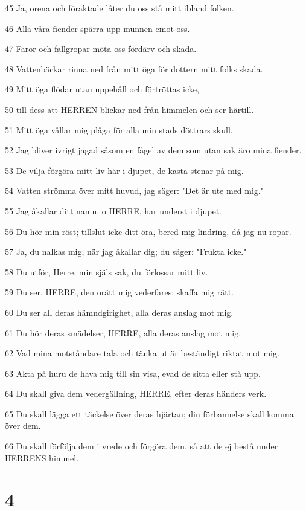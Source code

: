 \par 45 Ja, orena och föraktade låter du oss stå mitt ibland folken.
\par 46 Alla våra fiender spärra upp munnen emot oss.
\par 47 Faror och fallgropar möta oss fördärv och skada.
\par 48 Vattenbäckar rinna ned från mitt öga för dottern mitt folks skada.
\par 49 Mitt öga flödar utan uppehåll och förtröttas icke,
\par 50 till dess att HERREN blickar ned från himmelen och ser härtill.
\par 51 Mitt öga vållar mig plåga för alla min stads döttrars skull.
\par 52 Jag bliver ivrigt jagad såsom en fågel av dem som utan sak äro mina fiender.
\par 53 De vilja förgöra mitt liv här i djupet, de kasta stenar på mig.
\par 54 Vatten strömma över mitt huvud, jag säger: "Det är ute med mig."
\par 55 Jag åkallar ditt namn, o HERRE, har underst i djupet.
\par 56 Du hör min röst; tillslut icke ditt öra, bered mig lindring, då jag nu ropar.
\par 57 Ja, du nalkas mig, när jag åkallar dig; du säger: "Frukta icke."
\par 58 Du utför, Herre, min själs sak, du förlossar mitt liv.
\par 59 Du ser, HERRE, den orätt mig vederfares; skaffa mig rätt.
\par 60 Du ser all deras hämndgirighet, alla deras anslag mot mig.
\par 61 Du hör deras smädelser, HERRE, alla deras anslag mot mig.
\par 62 Vad mina motståndare tala och tänka ut är beständigt riktat mot mig.
\par 63 Akta på huru de hava mig till sin visa, evad de sitta eller stå upp.
\par 64 Du skall giva dem vedergällning, HERRE, efter deras händers verk.
\par 65 Du skall lägga ett täckelse över deras hjärtan; din förbannelse skall komma över dem.
\par 66 Du skall förfölja dem i vrede och förgöra dem, så att de ej bestå under HERRENS himmel.

\chapter{4}

